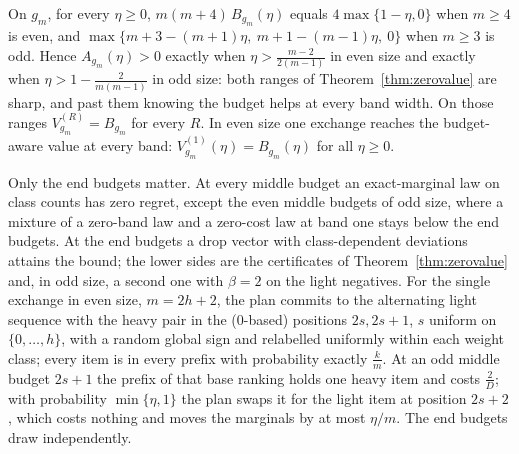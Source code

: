 \begin{theorem}
\label{thm:awareexact}
On $g_m$, for every $\eta\ge0$, $m(m+4)\,B_{g_m}(\eta)$ equals $4\max\{1-\eta,0\}$ when $m\ge4$ is
even, and $\max\{m+3-(m+1)\eta,\ m+1-(m-1)\eta,\ 0\}$ when $m\ge3$ is odd. Hence $A_{g_m}(\eta)>0$ exactly when $\eta>\frac{m-2}{2(m-1)}$ in even size and exactly when
$\eta>1-\frac2{m(m-1)}$ in odd size: both ranges of Theorem~\ref{thm:zerovalue} are sharp, and
past them knowing the budget helps at every band width. On those ranges $V^{(R)}_{g_m}=B_{g_m}$ for
every $R$. In even size one exchange reaches the budget-aware value at every band:
$V^{(1)}_{g_m}(\eta)=B_{g_m}(\eta)$ for all $\eta\ge0$.
\end{theorem}

Only the end budgets matter. At every middle budget an exact-marginal law on class counts has zero
regret, except the even middle budgets of odd size, where a mixture of a zero-band law and a
zero-cost law at band one stays below the end budgets. At the end budgets a drop vector with
class-dependent deviations attains the bound; the lower sides are the certificates of
Theorem~\ref{thm:zerovalue} and, in odd size, a second one with $\beta=2$ on the light negatives.
For the single exchange in even size, $m=2h+2$, the plan commits to the alternating light
sequence with the heavy pair in the (0-based) positions $2s,2s+1$, $s$ uniform on $\{0,\dots,h\}$, with a random global
sign and relabelled uniformly within each weight class; every item is in every prefix with
probability exactly $\frac km$. At an odd middle budget $2s+1$ the prefix of that base ranking holds
one heavy item and costs $\frac2D$; with probability $\min\{\eta,1\}$ the plan swaps it for the light
item at position $2s+2$, which
costs nothing and moves the marginals by at most $\eta/m$. The end budgets draw independently.

